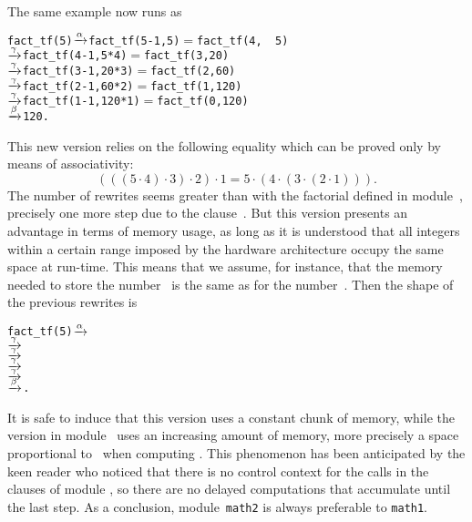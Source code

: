 The same example now runs as
\begin{alltt}
fact\_tf(5) \(\xrightarrow{\smash[t]{\alpha}}\) fact\_tf(5-1,5)     \(=\) fact\_tf(4,\ \ 5)
           \(\xrightarrow{\smash[t]{\gamma}}\) fact\_tf(4-1,5*4)   \(=\) fact\_tf(3, 20)
           \(\xrightarrow{\smash[t]{\gamma}}\) fact\_tf(3-1,20*3)  \(=\) fact\_tf(2, 60)
           \(\xrightarrow{\smash[t]{\gamma}}\) fact\_tf(2-1,60*2)  \(=\) fact\_tf(1,120)
           \(\xrightarrow{\smash[t]{\gamma}}\) fact\_tf(1-1,120*1) \(=\) fact\_tf(0,120)
           \(\xrightarrow{\smash[t]{\beta}}\) 120\textrm{.}
\end{alltt}
This new version relies on the following equality which can be proved
only by means of associativity:
\begin{equation*}
  (((5 \cdot 4) \cdot 3) \cdot 2) \cdot 1
= 5 \cdot (4 \cdot (3 \cdot (2 \cdot 1))).
\end{equation*}
The number of rewrites seems greater than with the factorial defined
in module~, precisely one more step due to the
clause~\clause{\alpha}. But this version presents an advantage in
terms of memory usage, as long as it is understood that all integers
within a certain range imposed by the hardware architecture occupy the
same space at run\hyp{}time. This means that we assume, for instance,
that the memory needed to store the number~ is the same
as for the number~. Then the shape of the previous rewrites
is
\begin{alltt}
fact_tf(5) \(\xrightarrow{\smash[t]{\alpha}}\) 
           \(\xrightarrow{\smash[t]{\gamma}}\) 
           \(\xrightarrow{\smash[t]{\gamma}}\) 
           \(\xrightarrow{\smash[t]{\gamma}}\) 
           \(\xrightarrow{\smash[t]{\gamma}}\) 
           \(\xrightarrow{\smash[t]{\beta}}\) \textrm{.}
\end{alltt}
It is safe to induce that this version uses a constant chunk of
memory, while the version in module~ uses an increasing
amount of memory, more precisely a space proportional to~
when computing . This phenomenon has been
anticipated by the keen reader who noticed that there is no control
context for the calls in the clauses of module , so
there are no delayed computations that accumulate until the last
step. As a conclusion, module~\texttt{math2} is always preferable to
\texttt{math1}.


